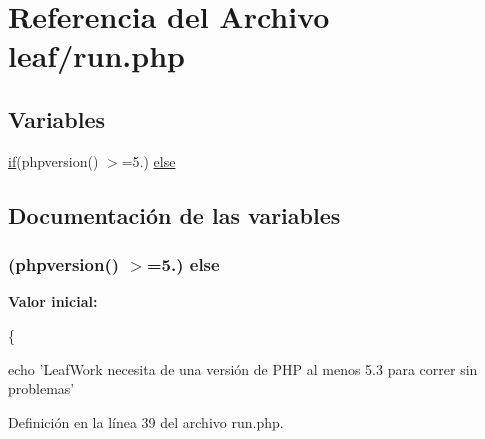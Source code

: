 \hypertarget{run_8php}{\section{Referencia del Archivo leaf/run.php}
\label{run_8php}
}
\subsection*{Variables}
\begin{DoxyCompactItemize}
\item 
\hyperlink{index_8php_a03ed0eadab502a2cb754ef4963570e97}{if}(phpversion() $>$=5.) \hyperlink{run_8php_a841a01fe8b86daf8a134ce39b9193f6d}{else}
\end{DoxyCompactItemize}


\subsection{Documentación de las variables}
\hypertarget{run_8php_a841a01fe8b86daf8a134ce39b9193f6d}{
\subsubsection[{else}]{ (phpversion() $>$=5.) else}}\label{run_8php_a841a01fe8b86daf8a134ce39b9193f6d}
{\bfseries Valor inicial\-:}
\begin{DoxyCode}
\{
      
      echo \textcolor{stringliteral}{'LeafWork necesita de una versión de PHP al menos 5.3 para correr sin problemas'}
\end{DoxyCode}


Definición en la línea 39 del archivo run.\-php.

